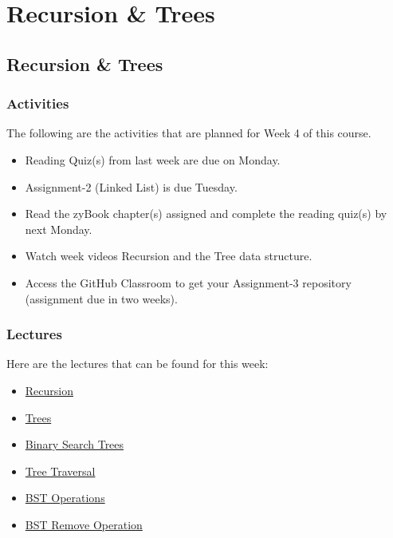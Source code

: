 \clearpage

\renewcommand{\ChapTitle}{Recursion \& Trees}

\chapter{\ChapTitle}
\section{\ChapTitle}

\subsection{Activities}

The following are the activities that are planned for Week 4 of this course.

\begin{itemize}
    \item Reading Quiz(s) from last week are due on Monday.
    \item Assignment-2 (Linked List) is due Tuesday.
    \item Read the zyBook chapter(s) assigned and complete the reading quiz(s) by next Monday.
    \item Watch week videos Recursion and the Tree data structure.
    \item Access the GitHub Classroom to get your Assignment-3 repository  (assignment due in two weeks).
\end{itemize}

\subsection{Lectures}

Here are the lectures that can be found for this week:

\begin{itemize}
    \item \href{https://applied.cs.colorado.edu/mod/hvp/view.php?id=45909}{Recursion}
    \item \href{https://applied.cs.colorado.edu/mod/hvp/view.php?id=45910}{Trees}
    \item \href{https://applied.cs.colorado.edu/mod/hvp/view.php?id=45911}{Binary Search Trees}
    \item \href{https://applied.cs.colorado.edu/mod/hvp/view.php?id=45912}{Tree Traversal}
    \item \href{https://applied.cs.colorado.edu/mod/hvp/view.php?id=45913}{BST Operations}
    \item \href{https://applied.cs.colorado.edu/mod/hvp/view.php?id=45914}{BST Remove Operation}
\end{itemize}

